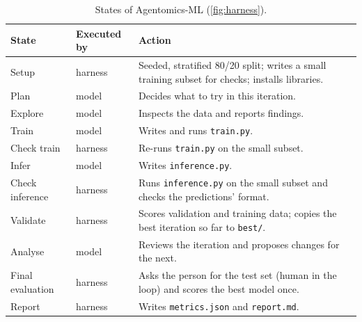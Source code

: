 \begin{table}[tbp]\centering\small
\caption{States of Agentomics-ML (\cref{fig:harness}).}\label{tab:states}
\begin{tabular}{@{}l l p{9.2cm}@{}}\toprule
State & Executed by & Action\\\midrule
Setup & harness & Seeded, stratified 80/20 split; writes a small training subset for checks; installs libraries.\\
Plan & model & Decides what to try in this iteration.\\
Explore & model & Inspects the data and reports findings.\\
Train & model & Writes and runs \texttt{train.py}.\\
Check train & harness & Re-runs \texttt{train.py} on the small subset.\\
Infer & model & Writes \texttt{inference.py}.\\
Check inference & harness & Runs \texttt{inference.py} on the small subset and checks the predictions' format.\\
Validate & harness & Scores validation and training data; copies the best iteration so far to \texttt{best/}.\\
Analyse & model & Reviews the iteration and proposes changes for the next.\\
Final evaluation & harness & Asks the person for the test set (human in the loop) and scores the best model once.\\
Report & harness & Writes \texttt{metrics.json} and \texttt{report.md}.\\
\bottomrule\end{tabular}
\end{table}

